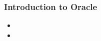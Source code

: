 \begin{frame}

	\frametitle{ Introduction to Oracle}
	
	\begin{itemize}
	
	    \item
	
	    \item
	
	\end{itemize}
	
\end{frame}